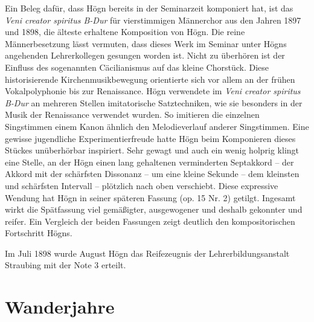 \documentclass{book}
\begin{document}
Ein Beleg dafür, dass Högn bereits in der Seminarzeit komponiert hat,
ist das \textit{Veni creator spiritus B-Dur} für vierstimmigen
Männerchor aus den Jahren 1897 und 1898, die älteste erhaltene
Komposition von Högn. Die reine Männerbesetzung lässt vermuten, dass
dieses Werk im Seminar unter Högns angehenden Lehrerkollegen gesungen
worden ist. Nicht zu überhören ist der Einfluss des sogenannten
Cäcilianismus auf das kleine Chorstück. Diese historisierende
Kirchenmusikbewegung orientierte sich vor allem an der frühen
Vokalpolyphonie bis zur Renaissance. Högn verwendete im \textit{Veni
creator spiritus B-Dur} an mehreren Stellen imitatorische
Satztechniken, wie sie besonders in der Musik der Renaissance verwendet
wurden. So imitieren die einzelnen Singstimmen einem Kanon ähnlich den
Melodieverlauf anderer Singstimmen. Eine gewisse jugendliche
Experimentierfreude hatte Högn beim Komponieren dieses Stückes
unüberhörbar inspiriert. Sehr gewagt und auch ein wenig holprig klingt
eine Stelle, an der Högn einen lang gehaltenen verminderten Septakkord
– der Akkord mit der schärfsten Dissonanz – um eine kleine Sekunde –
dem kleinsten und schärfsten Intervall – plötzlich nach oben
verschiebt. Diese expressive Wendung hat Högn in seiner späteren
Fassung (op. 15 Nr. 2) getilgt. Ingesamt wirkt die Spätfassung viel
gemäßigter, ausgewogener und deshalb gekonnter und reifer. Ein
Vergleich der beiden Fassungen zeigt deutlich den kompositorischen
Fortschritt Högns.

Im Juli 1898 wurde August Högn das Reifezeugnis der
Lehrerbildungsanstalt Straubing mit der Note 3 erteilt.

\section{Wanderjahre}
\end{document}
